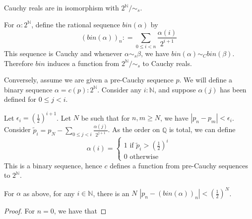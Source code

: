 \begin{proposition}
  Cauchy reals are in isomorphism with $2^\mathbb N / \sim_s$. 
\end{proposition} 
\begin{definition}
  For $\alpha: 2^\mathbb N$, define the rational sequence $bin(\alpha)$ by 
  \begin{equation} (bin (\alpha))_n :  = \sum\limits_{0 \leq i < n} \frac{\alpha(i)} { 2^{i+1}} \end{equation}  
  This sequence is Cauchy and whenever $\alpha\sim_s \beta$, we have 
  $bin(\alpha) \sim_C bin(\beta)$. 
  Therefore $bin$ induces a function from $2^\mathbb N / \sim_s$ to Cauchy reals. 
\end{definition}  
\begin{definition}
  Conversely, assume we are given a pre-Cauchy sequence $p$. 
  We will define a binary sequence $\alpha  = c(p): 2^\mathbb N$.
  Consider any $i:\mathbb N$, and suppose $\alpha(j)$ has been defined for $0 \leq j<i$. 

  Let $\epsilon_i = (\frac12)^{i+1}$. %
  Let $N$ be such that for $n,m \geq N$, we have $|p_n - p_m| < \epsilon_i$. 
  Consider $\widetilde p_i = p_N - \sum\limits_{0\leq j < i} \frac {\alpha(j)}{2^{j+1}}$.
  As the order on $\mathbb Q$ is total, we can define 
  \begin{equation}
    \alpha(i) = \begin{cases}
    1 \text{ if } \widetilde p_i > (\frac12)^{i} \\
    0 \text{ otherwise } 
    \end{cases} 
  \end{equation}  
  This is a binary sequence, hence $c$ defines a function from pre-Cauchy sequences to $2^\mathbb N$.
\end{definition} 
\begin{lemma}
  For $\alpha$ as above, for any $i\in \mathbb N$, there is an $N$
  $|p_n-(bin(\alpha))_n| < (\frac{1}{2})^N$. 
\end{lemma}
\begin{proof}
  For $n = 0$, we have that 
\end{proof}  




